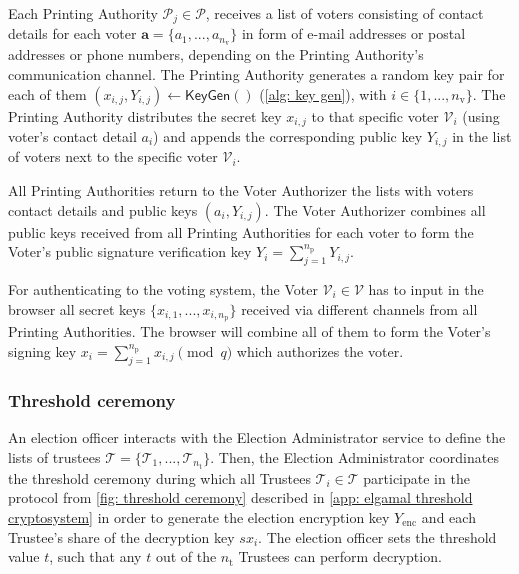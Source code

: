 Each Printing Authority $\mathcal{P}_j \in \boldsymbol{\mathcal{P}}$, receives a list of voters consisting of contact details for each voter $\boldsymbol{a} = \{ a_1, ..., a_{n_\mathrm{v}} \}$ in form of e-mail addresses or postal addresses or phone numbers, depending on the Printing Authority's communication channel. The Printing Authority generates a random key pair for each of them $(x_{i, j}, Y_{i, j}) \leftarrow \mathsf{KeyGen}()$ (\cref{alg: key gen}), with $i \in \{ 1, ..., n_\mathrm{v} \}$. The Printing Authority distributes the secret key $x_{i, j}$ to that specific voter $\mathcal{V}_i$ (using voter's contact detail $a_i$) and appends the corresponding public key $Y_{i, j}$ in the list of voters next to the specific voter $\mathcal{V}_i$.

All Printing Authorities return to the Voter Authorizer the lists with voters contact details and public keys $(a_i, Y_{i,j})$. The Voter Authorizer combines all public keys received from all Printing Authorities for each voter to form the Voter's public signature verification key $Y_i = \sum_{j=1}^{n_\mathrm{p}} Y_{i, j}$.

For authenticating to the voting system, the Voter $\mathcal{V}_i \in \boldsymbol{\mathcal{V}}$ has to input in the browser all secret keys $\{ x_{i, 1}, ..., x_{i, n_\mathrm{p}} \}$ received via different channels from all Printing Authorities. The browser will combine all of them to form the Voter's signing key $x_i = \sum_{j=1}^{n_\mathrm{p}} x_{i, j} \pmod q$ which authorizes the voter.


\subsubsection{Threshold ceremony} \label{sec: threshold ceremony}
An election officer interacts with the Election Administrator service to define the lists of trustees $\boldsymbol{\mathcal{T}} = \{ \mathcal{T}_1, ..., \mathcal{T}_{n_\mathrm{t}} \}$. Then, the Election Administrator coordinates the threshold ceremony during which all Trustees $\mathcal{T}_i \in \boldsymbol{\mathcal{T}}$ participate in the protocol from \cref{fig: threshold ceremony} described in \cref{app: elgamal threshold cryptosystem} in order to generate the election encryption key $Y_\mathrm{enc}$ and each Trustee's share of the decryption key $sx_i$. The election officer sets the threshold value $t$, such that any $t$ out of the $n_\mathrm{t}$ Trustees can perform decryption.

